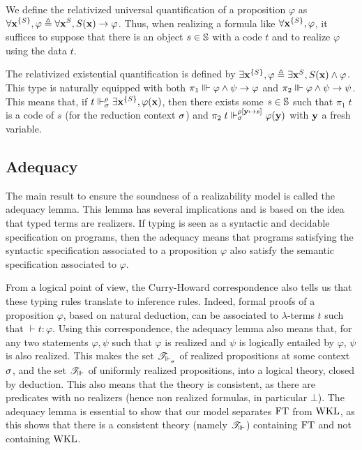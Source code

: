 \documentclass[a4paper,UKenglish,cleveref, autoref, thm-restate]{lipics-v2021}
\begin{document}
\begin{notation}
  We define the relativized universal quantification of a proposition $\varphi$ \linebreak
  as
  $\displaystyle\forall \mathbf{x}^{\{S\}}, \varphi \triangleq \forall \mathbf{x}^S, S(\mathbf{x}) \to \varphi$.
  Thus, when realizing a formula like $\forall \mathbf{x}^{\{S\}}, \varphi$, it suffices to suppose that there is an object $s \in \mathbb S$ with a code $t$ and to realize $\varphi$ using the data $t$.

  The relativized existential quantification is defined by $\exists \mathbf{x}^{\{S\}}, \varphi \triangleq \exists \mathbf{x}^{S}, S(\mathbf{x}) \land \varphi$.
  This type is naturally equipped with both
  $\pi_1 \Vvdash \varphi \land \psi \to \varphi$ and $\pi_2 \Vvdash \varphi \land \psi \to \psi$.
  This means that, if $t\Vdash_{\sigma}^{\rho} \exists\mathbf{x}^{\{S\}}, \varphi(\mathbf{x})$, then there exists some $s \in \mathbb S$ such that $\pi_1\;t$ is a code of $s$ (for the reduction context $\sigma$) and $\pi_2\;t \Vdash_{\sigma}^{\rho[\mathbf{y}\mapsto s]} \varphi(\mathbf{y})$ with $\mathbf{y}$ a fresh variable.
\end{notation}


\subsection{Adequacy}



The main result to ensure the soundness of a realizability model is called the adequacy lemma. This lemma has several implications and is based on the idea that typed terms are realizers. If typing is seen as a syntactic and decidable specification on programs, then the adequacy means that programs satisfying the syntactic specification associated to a proposition $\varphi$ also satisfy the semantic specification associated to $\varphi$.

From a logical point of view, the Curry-Howard correspondence also tells us that these typing rules translate to inference rules. Indeed, formal proofs of a proposition $\varphi$, based on natural deduction, can be associated to $\lambda$-terms $t$ such that $\vdash t : \varphi$. Using this correspondence, the adequacy lemma also means that, for any two statements $\varphi,\psi$ such that $\varphi$ is realized and $\psi$ is logically entailed by $\varphi$, $\psi$ is also realized. This makes the set $\mathscr T_{\Vdash_{\sigma}^{}}$ of realized propositions at some context $\sigma$, and the set $\mathscr T_{\Vvdash}$ of uniformly realized propositions, into a logical theory, closed by deduction. This also means that the theory is consistent, as there are predicates with no realizers (hence non realized formulas, in particular $\bot$). The adequacy lemma is essential to show that our model separates $\mathrm{FT}$ from $\mathrm{WKL}$, as this shows that there is a consistent theory (namely $\mathscr T_{\Vvdash}$) containing $\mathrm{FT}$ and not containing $\mathrm{WKL}$.
\end{document}
